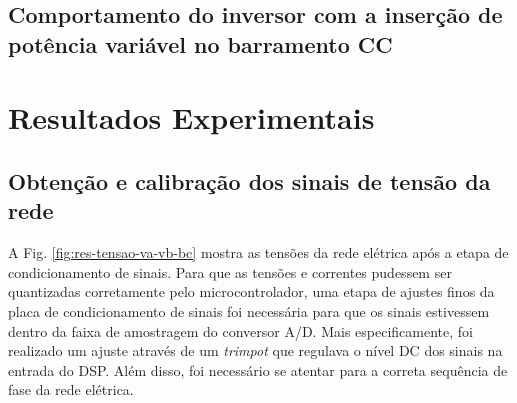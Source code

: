 \subsection{Comportamento do inversor com a inserção de potência variável no barramento CC}

\section{Resultados Experimentais}

\subsection{Obtenção e calibração dos sinais de tensão da rede}

A Fig. \ref{fig:res-tensao-va-vb-bc} mostra as tensões da rede elétrica após a etapa de condicionamento de sinais.
Para que as tensões e correntes pudessem ser quantizadas corretamente pelo microcontrolador, 
uma etapa de ajustes finos da placa de condicionamento de sinais foi necessária para que os sinais estivessem dentro da faixa de amostragem do conversor A/D.
Mais especificamente, foi realizado um ajuste através de um \textit{trimpot} que regulava o nível DC dos sinais na entrada do DSP.
Além disso, foi necessário se atentar para a correta sequência de fase da rede elétrica.

